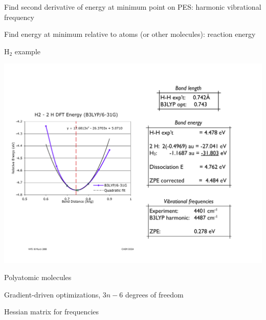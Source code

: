 \message{ !name(Outline.tex)}\documentclass[11pt]{article}
\begin{document}
\begin{outline}
\begin{outline}
  \item Find second derivative of energy at minimum point on PES: harmonic
    vibrational frequency
  \item Find energy at minimum relative to atoms (or other molecules): reaction energy
  \item H$_2$ example
    \begin{center}
      \includegraphics[scale=0.6]{Images/H2-PES}
    \end{center}
  \item Polyatomic molecules
    \begin{outline}
    \item Gradient-driven optimizations, $3n-6$ degrees of freedom
    \item Hessian matrix for frequencies
    \end{outline}
  \end{outline}


\end{outline}
\end{document}
